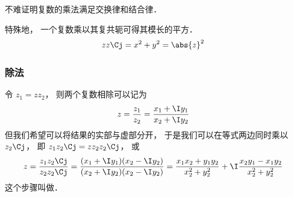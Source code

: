 不难证明复数的乘法满足交换律和结合律．

特殊地， 一个复数乘以其复共轭可得其模长的平方．
\begin{equation}
z z\Cj = x^2 + y^2 = \abs{z}^2
\end{equation}

\subsubsection{除法}
令 $z_1 = z z_2$， 则两个复数相除可以记为
\begin{equation}
z = \frac{z_1}{z_2} = \frac{x_1 + \I y_1}{x_2 + \I y_2}
\end{equation}
但我们希望可以将结果的实部与虚部分开， 于是我们可以在等式两边同时乘以 $z_2\Cj$， 即 $z_1 z_2\Cj  = z z_2 z_2\Cj$， 或
\begin{equation}
z = \frac{z_1 z_2\Cj}{z_2 z_2\Cj}
= \frac{(x_1 + \I y_1)(x_2 - \I y_2)}{(x_2 + \I y_2)(x_2 - \I y_2)}
= \frac{x_1 x_2 + y_1 y_2}{x_2^2 + y_2^2} + \I \frac{x_2 y_1 - x_1 y_2}{x_2^2 + y_2^2}
\end{equation}
这个步骤叫做．
